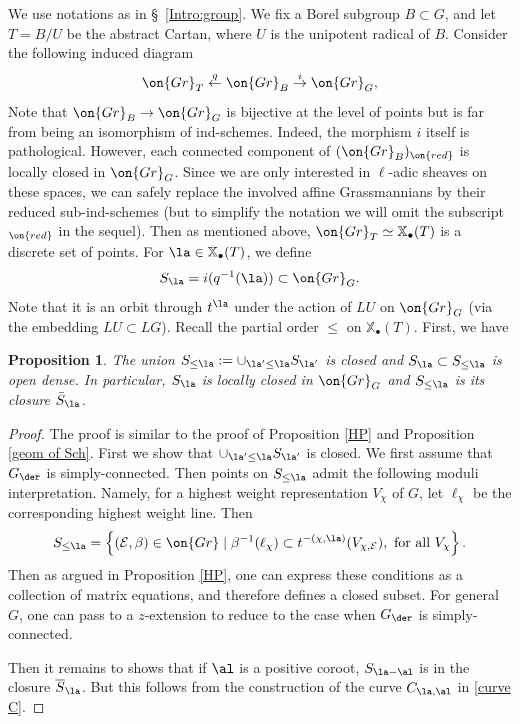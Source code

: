 \documentclass[]{pcmi}
\theoremstyle{plain}
\newtheorem{prop}[equation]{Proposition}
\theoremstyle{remark}
\theoremstyle{definition}
\newcommand{\mE}{{\mathcal E}}
\newcommand{\Gr}{{\on{Gr}}}
\def\xcoch{\mathbb{X}_\bullet}
\begin{document}
We use notations as in \S~\ref{Intro:group}. We fix a Borel subgroup $B\subset G$, and let $T=B/U$ be the abstract Cartan, where $U$ is the unipotent radical of $B$.
Consider the following induced diagram
\begin{equation}\label{CT diagram}
\Gr_{T}\stackrel{q}{\leftarrow} \Gr_{B}\stackrel{i}{\to} \Gr_{G},
\end{equation}
Note that $\Gr_{B}\to \Gr_{G}$ is bijective at the level of points but is far from being an isomorphism of ind-schemes. Indeed, the morphism $i$ itself is pathological. However, each connected component of $(\Gr_B)_{\on{red}}$ is locally closed in $\Gr_G$. Since we are only interested in $\ell$-adic sheaves on these spaces, we can safely replace the involved affine Grassmannians by their reduced sub-ind-schemes (but to simplify the notation we will omit the subscript $_{\on{red}}$ in the sequel). Then as mentioned above, $\Gr_T\simeq \xcoch(T)$ is a discrete set of points. For $\la\in\xcoch(T)$, we define
$$S_\la= i(q^{-1}(\la))\subset \Gr_G.$$
Note that it is an orbit through $t^\la$ under the action of $LU$ on $\Gr_G$ (via the embedding $LU\subset LG$). 
Recall the partial order $\leq$ on $\xcoch(T)$. First, we have
\begin{prop}\label{geom of Sla}
The union $S_{\leq \la}:=\cup_{\la'\leq \la} S_{\la'}$ is closed and $S_\la\subset S_{\leq \la}$ is open dense. In particular, $S_\la$ is locally closed in $\Gr_G$ and $S_{\leq \la}$ is its closure $\bar{S}_\la$.\end{prop}
\begin{proof}The proof is similar to the proof of Proposition \ref{HP} and Proposition \ref{geom of Sch}. First we show that $\cup_{\la'\leq \la} S_{\la'}$ is closed. We first assume that $G_\der$ is simply-connected. Then points on $S_{\leq \la}$ admit the following moduli interpretation. Namely, for a highest weight representation $V_\chi$ of $G$, let $\ell_\chi$ be the corresponding highest weight line. Then
\[S_{\leq \la}=\left\{(\mE,\beta)\in\Gr\mid \beta^{-1}(\ell_\chi)\subset t^{-(\chi,\la)}(V_{\chi,\mE}), \mbox{ for all } V_\chi\right\}.\] 
Then as argued in Proposition \ref{HP}, one can express these conditions as a collection of matrix equations, and therefore defines a closed subset. For general $G$, one can pass to a $z$-extension to reduce to the case when $G_\der$ is simply-connected.

Then it remains to shows that if $\al$ is a positive coroot, $S_{\la-\al}$ is in the closure $\overline{S}_\la$. But this follows from the construction of the curve $C_{\la,\al}$ in \eqref{curve C}. 
\end{proof}
\end{document}
